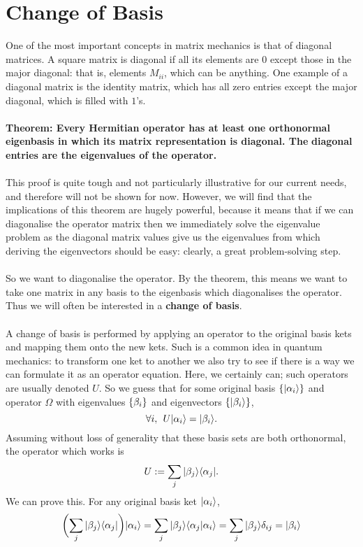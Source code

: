 \section{Change of Basis}
One of the most important concepts in matrix mechanics is that of diagonal matrices. A square matrix is diagonal if all its elements are $0$ except those in the major diagonal: that is, elements $M_{ii}$, which can be anything. One example of a diagonal matrix is the identity matrix, which has all zero entries except the major diagonal, which is filled with $1$'s.
\\\\
\textbf{{Theorem: Every Hermitian operator has at least one orthonormal eigenbasis in which its matrix representation is diagonal. The}}
\textbf{{diagonal entries are the eigenvalues of the operator.}}
\\\\
This proof is quite tough and not particularly illustrative for our current needs, and therefore will not be shown for now. However, we will find that the implications of this theorem are hugely powerful, because it means that if we can diagonalise the operator matrix then we immediately solve the eigenvalue problem as the diagonal matrix values give us the eigenvalues from which deriving the eigenvectors should be easy: clearly, a great problem-solving step.
\\\\
So we want to diagonalise the operator. By the theorem, this means we want to take one matrix in any basis to the eigenbasis which diagonalises the operator. Thus we will often be  interested in a \textbf{change of basis}.
\\\\
A change of basis is performed by applying an operator to the original basis kets and mapping them onto the new kets. Such is a common idea in quantum mechanics: to transform one ket to another we also try to see if there is a way we can formulate it as an operator equation. Here, we certainly can; such operators are usually denoted $U$. So we guess that for some original basis $\{|\alpha_{i}\rangle\}$ and operator $\Omega$ with eigenvalues $\{\beta_{i}\}$ and eigenvectors $\{|\beta_{i}\rangle\}$,
$$
\forall i, \:\: U|\alpha_{i}\rangle=|\beta_{i}\rangle.
$$
Assuming without loss of generality that these basis sets are both orthonormal, the operator which works is
$$
U:=\sum_{j}|\beta_{j}\rangle\langle\alpha_{j}|.
$$
We can prove this. For any original basis ket $|\alpha_{i}\rangle$,
$$
\biggl(\sum_{j}|\beta_{j}\rangle\langle\alpha_{j}|\biggr)|\alpha_{i}\rangle=\sum_{j}|\beta_{j}\rangle\langle\alpha_{j}|\alpha_{i}\rangle=\sum_{j}|\beta_{j}\rangle\delta_{ij}=|\beta_{i}\rangle
$$
